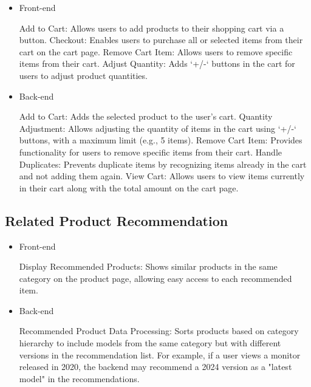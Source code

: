 \documentclass[conference]{IEEEtran}
\begin{document}
\begin{itemize}
\setlength{\parindent}{2ex}
\setlength{\parskip}{0.5em}
\item Front-end

Add to Cart: Allows users to add products to their shopping cart via a button. \newline\hspace*{1.2ex}
Checkout: Enables users to purchase all or selected items from their cart on the cart page. \newline\hspace*{1.2ex}
Remove Cart Item: Allows users to remove specific items from their cart. \newline\hspace*{1.2ex}
Adjust Quantity: Adds `+/-` buttons in the cart for users to adjust product quantities.

\item Back-end

Add to Cart: Adds the selected product to the user's cart.\newline\hspace*{1.2ex}
Quantity Adjustment: Allows adjusting the quantity of items in the cart using `+/-` buttons, with a maximum limit (e.g., 5 items). \newline\hspace*{1.2ex}
Remove Cart Item: Provides functionality for users to remove specific items from their cart. \newline\hspace*{1.2ex}
Handle Duplicates: Prevents duplicate items by recognizing items already in the cart and not adding them again. \newline\hspace*{1.2ex}
View Cart: Allows users to view items currently in their cart along with the total amount on the cart page.

\end{itemize}

\subsection{Related Product Recommendation}

\begin{itemize}
\setlength{\parindent}{2ex}
\setlength{\parskip}{0.5em}
\item Front-end

Display Recommended Products: Shows similar products in the same category on the product page, allowing easy access to each recommended item.

\item Back-end

Recommended Product Data Processing: Sorts products based on category hierarchy to include models from the same category but with different versions in the recommendation list. For example, if a user views a monitor released in 2020, the backend may recommend a 2024 version as a "latest model" in the recommendations.

\end{itemize}
\end{document}
